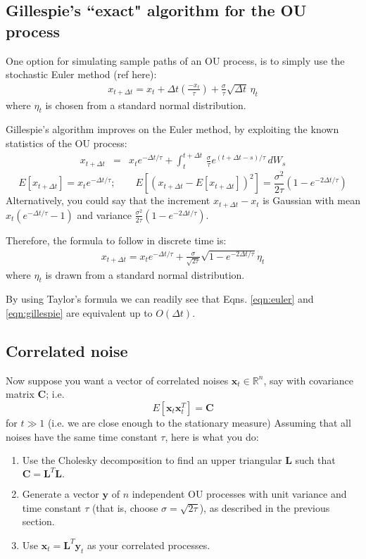 \documentclass[11pt]{article}
\newcommand{\Cvec}{\mathbf{C}}
\newcommand{\Lvec}{\mathbf{L}}
\newcommand{\xvec}{\mathbf{x}}
\newcommand{\yvec}{\mathbf{y}}
\newcommand {\R}{\mathbb{R}}
\begin{document}
\subsection*{Gillespie's ``exact" algorithm for the OU process}
One option for simulating sample paths of an OU process, is to simply use the stochastic Euler method (ref here):
\begin{eqnarray} 
x_{t+\Delta t} = x_t + \Delta t \left( \frac{-x_t}{\tau} \right) + \frac{\sigma}{\tau} \sqrt{\Delta t} \, \eta_t \label{eqn:euler}
\end{eqnarray}
where $\eta_t$ is chosen from a standard normal distribution.

Gillespie's algorithm improves on the Euler method, by exploiting the known statistics of the OU process: 
\begin{eqnarray}
x_{t+\Delta t} & = & x_t e^{-\Delta t/\tau} + \int_t^{t + \Delta t} \, \frac{\sigma}{\tau} e^{(t+\Delta t-s)/\tau} \, dW_s
\end{eqnarray}
\[ E[x_{t+\Delta t}] =  x_t e^{-\Delta t/\tau}; \qquad E\left[(x_{t+\Delta t} - E[x_{t+\Delta t}])^2\right]  = \frac{\sigma^2}{2\tau} (1-e^{-2\Delta t/\tau})
\]
Alternatively, you could say that the increment $x_{t+\Delta t} - x_t$ is Gaussian with mean $x_t (e^{-\Delta t/\tau}-1)$ and variance 
$\frac{\sigma^2}{2\tau} (1-e^{-2\Delta t/\tau})$.

Therefore, the formula to follow in discrete time is:
\begin{eqnarray} 
x_{t+\Delta t} = x_t e^{-\Delta t/\tau} + \frac{\sigma}{\sqrt{2 \tau}} \sqrt{1-e^{-2\Delta t/\tau}} \eta_t \label{eqn:gillespie}
\end{eqnarray}
where $\eta_t$ is drawn from a standard normal distribution.

By using Taylor's formula we can readily see that Eqns. \eqref{eqn:euler} and \eqref{eqn:gillespie} are  equivalent up to $O(\Delta t)$.

\subsection*{Correlated noise}
Now suppose you want a vector of correlated noises $\xvec_t \in \R^n$, say with covariance matrix $\Cvec$; i.e. 
\[ E \left[ \xvec_t \xvec_t^T \right] = \Cvec
\] 
for $t \gg 1$ (i.e. we are close enough to the stationary measure)
Assuming that all noises have the same time constant $\tau$, here is what you do:

\begin{enumerate}
\item Use the Cholesky decomposition to find an upper triangular $\Lvec$ such that $\Cvec = \Lvec^T \Lvec.$
\item Generate a vector $\yvec$ of $n$ independent OU processes with unit variance and time constant $\tau$ (that is, choose $\sigma = \sqrt{2 \tau}$), as described in the previous section.
\item Use $\xvec_t = \Lvec^T \yvec_t$ as your correlated processes.
\end{enumerate}



\end{document}
